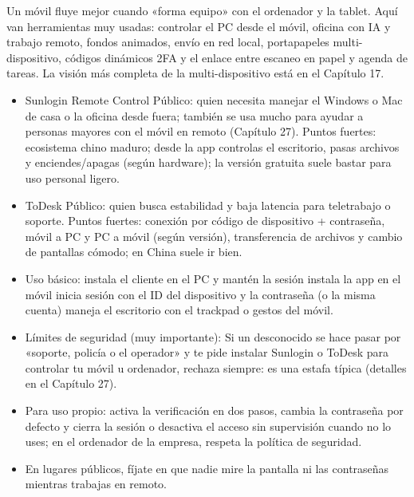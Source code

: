 
Un móvil fluye mejor cuando «forma equipo» con el ordenador y la tablet. Aquí van herramientas muy usadas: controlar el PC desde el móvil, oficina con IA y trabajo remoto, fondos animados, envío en red local, portapapeles multi-dispositivo, códigos dinámicos 2FA y el enlace entre escaneo en papel y agenda de tareas. La visión más completa de la multi-dispositivo está en el Capítulo 17.


\begin{itemize}
  \item Sunlogin Remote Control Público: quien necesita manejar el Windows o Mac de casa o la oficina desde fuera; también se usa mucho para ayudar a personas mayores con el móvil en remoto (Capítulo 27). Puntos fuertes: ecosistema chino maduro; desde la app controlas el escritorio, pasas archivos y enciendes/apagas (según hardware); la versión gratuita suele bastar para uso personal ligero.
  \item ToDesk Público: quien busca estabilidad y baja latencia para teletrabajo o soporte. Puntos fuertes: conexión por código de dispositivo + contraseña, móvil a PC y PC a móvil (según versión), transferencia de archivos y cambio de pantallas cómodo; en China suele ir bien.
  \item Uso básico: instala el cliente en el PC y mantén la sesión instala la app en el móvil inicia sesión con el ID del dispositivo y la contraseña (o la misma cuenta) maneja el escritorio con el trackpad o gestos del móvil.
  \item Límites de seguridad (muy importante): Si un desconocido se hace pasar por «soporte, policía o el operador» y te pide instalar Sunlogin o ToDesk para controlar tu móvil u ordenador, rechaza siempre: es una estafa típica (detalles en el Capítulo 27).
  \item Para uso propio: activa la verificación en dos pasos, cambia la contraseña por defecto y cierra la sesión o desactiva el acceso sin supervisión cuando no lo uses; en el ordenador de la empresa, respeta la política de seguridad.
  \item En lugares públicos, fíjate en que nadie mire la pantalla ni las contraseñas mientras trabajas en remoto.
\end{itemize}


